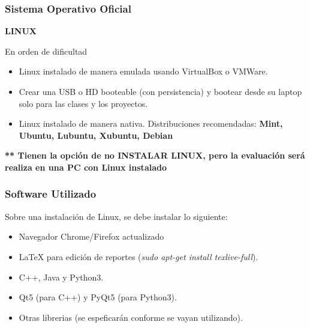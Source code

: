 \begin{frame}
\frametitle{Sistema Operativo Oficial}

\textbf{LINUX}
\begin{block}{En orden de dificultad}
\begin{itemize}
\item Linux instalado de manera emulada usando VirtualBox o VMWare.
\item Crear una USB o HD booteable (con persistencia) y bootear desde su laptop solo para las clases y los proyectos.
\item Linux instalado de manera nativa. Distribuciones recomendadas: \textbf{Mint, Ubuntu, Lubuntu, Xubuntu, Debian}
\end{itemize}
\end{block}
\textbf{** Tienen la opción de no INSTALAR LINUX, pero la evaluación será realiza en una PC con Linux instalado}
\end{frame}


\begin{frame}
\frametitle{Software Utilizado}
Sobre una instalación de Linux, se debe instalar lo siguiente:
\begin{itemize}
\item Navegador Chrome/Firefox actualizado
\item LaTeX para edición de reportes (\textit{sudo apt-get install texlive-full}).
\item C++, Java y Python3.
\item Qt5 (para C++) y PyQt5 (para Python3).
\item Otras librerias (se espeficarán conforme se vayan utilizando).
\end{itemize}
\end{frame}

